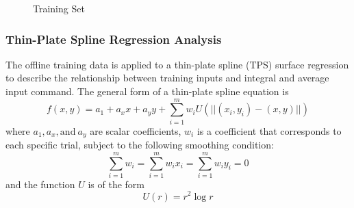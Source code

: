 \documentclass[letterpaper, 10 pt, conference]{ieeeconf}  %
\newcommand\NB[1]{$\spadesuit$\footnote{NB: #1}}
\begin{document}
\begin{figure}[H]
	\centering
	\caption{Training Set}
	\label{fig:trainelab}
\end{figure}

\subsubsection{Thin-Plate Spline Regression Analysis}

The offline training data is applied to a thin-plate spline (TPS) surface regression to describe the relationship between training inputs and integral and average input command. The general form of a thin-plate spline equation is 
\begin{equation}
    f(x,y) = a_1 + a_xx + a_yy + \sum_{i=1}^mw_iU(||(x_i,y_i)-(x,y)||)
\end{equation}
where $a_1,a_x,\text{and}~a_y$ are scalar coefficients, $w_i$ is a coefficient that corresponds to each specific trial, subject to the following smoothing condition: \begin{equation}
\sum_{i=1}^mw_i=\sum_{i=1}^mw_ix_i=\sum_{i=1}^mw_iy_i=0
\end{equation}
and the function $U$ is of the form
\begin{equation}
  U(r) = r^2\log{r} 
\end{equation}
\end{document}
